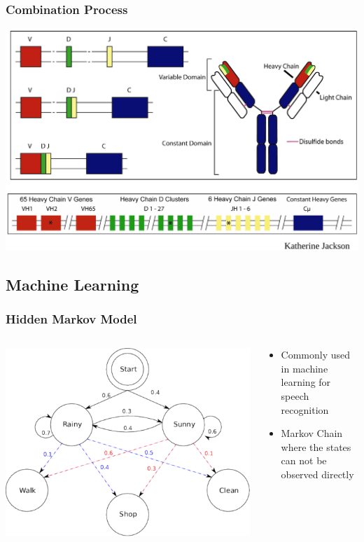 \documentclass{beamer}
\begin{document}
\begin{frame}
\frametitle{Combination Process}
\includegraphics[width=\textwidth]{rearrangement.pdf}
\end{frame}

\subsection{Machine Learning}

\begin{frame}
\frametitle{Hidden Markov Model}
\begin{columns}
  \begin{column}{.5\textwidth} 
    \includegraphics[width=\textwidth]{hmm-graph.pdf}
  \end{column}
  \begin{column}{.5\textwidth} 
    \begin{itemize}
      \item Commonly used in machine learning for speech recognition
      \item Markov Chain where the states can not be observed directly
    \end{itemize}
  \end{column}
\end{columns}
\end{frame}
\end{document}
